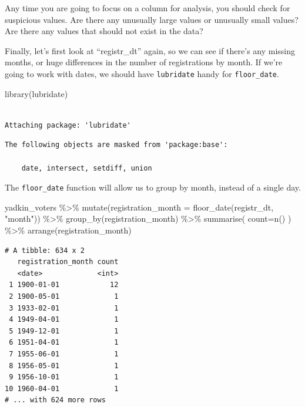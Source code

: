 \documentclass[
  letterpaper,
  DIV=11,
  numbers=noendperiod]{scrreprt}
\newenvironment{Shaded}{\begin{snugshade}}{\end{snugshade}}
\newcommand{\AttributeTok}[1]{\textcolor[rgb]{0.40,0.45,0.13}{#1}}
\newcommand{\FunctionTok}[1]{\textcolor[rgb]{0.28,0.35,0.67}{#1}}
\newcommand{\NormalTok}[1]{\textcolor[rgb]{0.00,0.23,0.31}{#1}}
\newcommand{\SpecialCharTok}[1]{\textcolor[rgb]{0.37,0.37,0.37}{#1}}
\newcommand{\StringTok}[1]{\textcolor[rgb]{0.13,0.47,0.30}{#1}}
\begin{document}
Any time you are going to focus on a column for analysis, you should
check for suspicious values. Are there any unusually large values or
unusually small values? Are there any values that should not exist in
the data?

Finally, let's first look at ``registr\_dt'' again, so we can see if
there's any missing months, or huge differences in the number of
registrations by month. If we're going to work with dates, we should
have \texttt{lubridate} handy for \texttt{floor\_date}.

\begin{Shaded}
\begin{Highlighting}[]
\FunctionTok{library}\NormalTok{(lubridate)}
\end{Highlighting}
\end{Shaded}

\begin{verbatim}

Attaching package: 'lubridate'
\end{verbatim}

\begin{verbatim}
The following objects are masked from 'package:base':

    date, intersect, setdiff, union
\end{verbatim}

The \texttt{floor\_date} function will allow us to group by month,
instead of a single day.

\begin{Shaded}
\begin{Highlighting}[]
\NormalTok{yadkin\_voters }\SpecialCharTok{\%\textgreater{}\%}
  \FunctionTok{mutate}\NormalTok{(}\AttributeTok{registration\_month =} \FunctionTok{floor\_date}\NormalTok{(registr\_dt, }\StringTok{"month"}\NormalTok{)) }\SpecialCharTok{\%\textgreater{}\%}
  \FunctionTok{group\_by}\NormalTok{(registration\_month) }\SpecialCharTok{\%\textgreater{}\%}
   \FunctionTok{summarise}\NormalTok{(}
    \AttributeTok{count=}\FunctionTok{n}\NormalTok{()}
\NormalTok{  ) }\SpecialCharTok{\%\textgreater{}\%}
  \FunctionTok{arrange}\NormalTok{(registration\_month)}
\end{Highlighting}
\end{Shaded}

\begin{verbatim}
# A tibble: 634 x 2
   registration_month count
   <date>             <int>
 1 1900-01-01            12
 2 1900-05-01             1
 3 1933-02-01             1
 4 1949-04-01             1
 5 1949-12-01             1
 6 1951-04-01             1
 7 1955-06-01             1
 8 1956-05-01             1
 9 1956-10-01             1
10 1960-04-01             1
# ... with 624 more rows
\end{verbatim}
\end{document}
